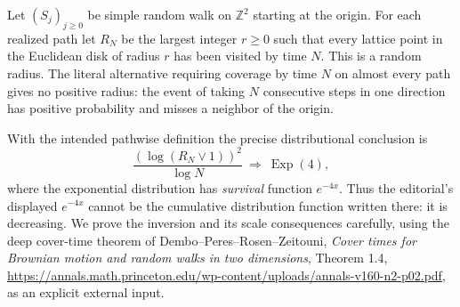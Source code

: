 Let $(S_j)_{j\ge0}$ be simple random walk on $\mathbb Z^2$ starting at the origin. For each realized path let $R_N$ be the largest integer $r\ge0$ such that every lattice point in the Euclidean disk of radius $r$ has been visited by time $N$. This is a random radius. The literal alternative requiring coverage by time $N$ on almost every path gives no positive radius: the event of taking $N$ consecutive steps in one direction has positive probability and misses a neighbor of the origin.

With the intended pathwise definition the precise distributional conclusion is
\[
 \frac{(\log(R_N\vee1))^2}{\log N}\ \Longrightarrow\ \operatorname{Exp}(4),\tag{1}
\]
where the exponential distribution has \emph{survival} function $e^{-4x}$. Thus the editorial's displayed $e^{-4x}$ cannot be the cumulative distribution function written there: it is decreasing. We prove the inversion and its scale consequences carefully, using the deep cover-time theorem of Dembo--Peres--Rosen--Zeitouni, \emph{Cover times for Brownian motion and random walks in two dimensions}, Theorem 1.4, \url{https://annals.math.princeton.edu/wp-content/uploads/annals-v160-n2-p02.pdf}, as an explicit external input.
